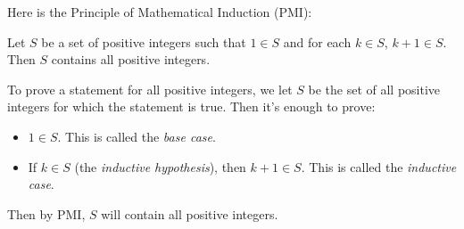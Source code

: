 \documentclass{amsart}
\begin{document}
Here is the Principle of Mathematical Induction (PMI):
\begin{tcolorbox}
  Let $S$ be a set of positive integers such that $1\in S$ and for each $k\in S$,
  $k+1\in S$. Then $S$ contains all positive integers.
\end{tcolorbox}

To prove a statement for all positive integers, we let $S$ be the set of all
positive integers for which the statement is true. Then it's enough to prove:
\begin{itemize}
  \item $1\in S$. This is called the \emph{base case}.
  \item If $k\in S$ (the \emph{inductive hypothesis}), then $k+1\in S$. This is
    called the \emph{inductive case}.
\end{itemize}
Then by PMI, $S$ will contain all positive integers.
\end{document}
